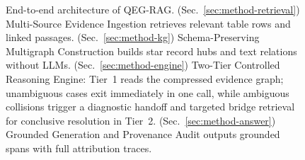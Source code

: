 \begin{figure}[t]
\centering
\resizebox{0.92\linewidth}{!}{}
\vspace{2.5mm}
\caption{End-to-end architecture of QEG-RAG. (Sec.~\ref{sec:method-retrieval}) Multi-Source Evidence Ingestion retrieves relevant table rows and linked passages. (Sec.~\ref{sec:method-kg}) Schema-Preserving Multigraph Construction builds star record hubs and text relations without LLMs. (Sec.~\ref{sec:method-engine}) Two-Tier Controlled Reasoning Engine: Tier~1 reads the compressed evidence graph; unambiguous cases exit immediately in one call, while ambiguous collisions trigger a diagnostic handoff and targeted bridge retrieval for conclusive resolution in Tier~2. (Sec.~\ref{sec:method-answer}) Grounded Generation and Provenance Audit outputs grounded spans with full attribution traces.}
\vspace{-2mm}
\label{fig:pipeline}
\end{figure}
